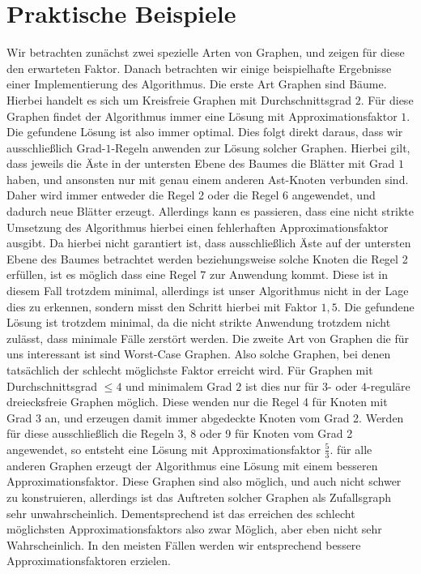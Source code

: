 \documentclass[12pt,onecolumn, notitlepage]{scrartcl}
\begin{document}
\section{Praktische Beispiele}\label{sec:SG}
Wir betrachten zunächst zwei spezielle Arten von Graphen, und zeigen für diese den erwarteten Faktor. Danach betrachten wir einige beispielhafte Ergebnisse einer Implementierung des Algorithmus. \newline \newline
Die erste Art Graphen sind Bäume. Hierbei handelt es sich um Kreisfreie Graphen mit Durchschnittsgrad $2$. Für diese Graphen findet der Algorithmus immer eine Lösung mit Approximationsfaktor $1$. Die gefundene Lösung ist also immer optimal. Dies folgt direkt daraus, dass wir ausschließlich Grad-$1$-Regeln anwenden zur Lösung solcher Graphen. Hierbei gilt, dass jeweils die Äste in der untersten Ebene des Baumes die Blätter mit Grad $1$ haben, und ansonsten nur mit genau einem anderen Ast-Knoten verbunden sind. Daher wird immer entweder die Regel 2 oder die Regel 6 angewendet, und dadurch neue Blätter erzeugt. Allerdings kann es passieren, dass eine nicht strikte Umsetzung des Algorithmus hierbei einen fehlerhaften Approximationsfaktor ausgibt. Da hierbei nicht garantiert ist, dass ausschließlich Äste auf der untersten Ebene des Baumes betrachtet werden beziehungsweise solche Knoten die Regel 2 erfüllen, ist es möglich dass eine Regel 7 zur Anwendung kommt. Diese ist in diesem Fall trotzdem minimal, allerdings ist unser Algorithmus nicht in der Lage dies zu erkennen, sondern misst den Schritt hierbei mit Faktor $1,5$. Die gefundene Lösung ist trotzdem minimal, da die nicht strikte Anwendung trotzdem nicht zulässt, dass minimale Fälle zerstört werden. \newline\newline
Die zweite Art von Graphen die für uns interessant ist sind Worst-Case Graphen. Also solche Graphen, bei denen tatsächlich der schlecht möglichste Faktor erreicht wird. Für Graphen mit Durchschnittsgrad $\leq 4$ und minimalem Grad $2$ ist dies nur für $3$- oder $4$-reguläre dreiecksfreie Graphen möglich. Diese wenden nur die Regel 4 für Knoten mit Grad 3 an, und erzeugen damit immer abgedeckte Knoten vom Grad 2. Werden für diese ausschließlich die Regeln 3, 8 oder 9 für Knoten vom Grad 2 angewendet, so entsteht eine Lösung mit Approximationsfaktor $\frac{5}{3}$. für alle anderen Graphen erzeugt der Algorithmus eine Lösung mit einem besseren Approximationsfaktor. Diese Graphen sind also möglich, und auch nicht schwer zu konstruieren, allerdings ist das Auftreten solcher Graphen als Zufallsgraph sehr unwahrscheinlich. Dementsprechend ist das erreichen des schlecht möglichsten Approximationsfaktors also zwar Möglich, aber eben nicht sehr Wahrscheinlich. In den meisten Fällen werden wir entsprechend bessere Approximationsfaktoren erzielen. \newline\newline
\end{document}
